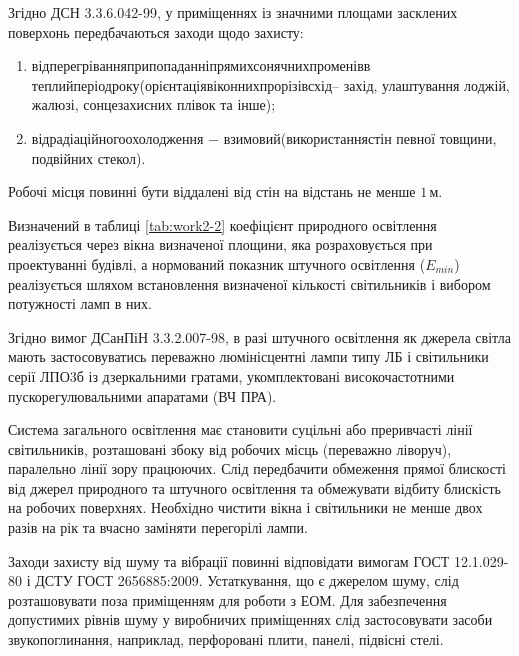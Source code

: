 Згідно ДСН 3.3.6.042-99, у приміщеннях із значними площами засклених поверхонь передбачаються заходи щодо захисту:

\begin{enumerate}
	\item від\hfill перегрівання\hfill при\hfill попаданні\hfill прямих\hfill сонячних\hfill променів\hfill в\newline \hspace*{-18mm} теплий\hfill період\hfill року\hfill (орієнтація\hfill віконних\hfill прорізів\hfill схід\hfill – захід,\newline \hspace*{-18mm} улаштування лоджій, жалюзі, сонцезахисних плівок та інше);
	\item від\hfill радіаційного\hfill охолодження $-$ в\hfill зимовий\hfill (використання\hfill стін\newline \hspace*{-18mm} певної товщини, подвійних стекол).
\end{enumerate}

Робочі місця повинні бути віддалені від стін на відстань не менше $1 \, \text{м}$. 

Визначений в таблиці \ref{tab:work2-2} коефіцієнт природного освітлення реалізується через вікна визначеної площини, яка розраховується при проектуванні будівлі, а нормований показник штучного освітлення ($E_{min}$) реалізується шляхом встановлення визначеної кількості світильників і вибором потужності ламп в них.

Згідно вимог ДСанПіН 3.3.2.007-98, в разі штучного освітлення як джерела світла мають застосовуватись переважно люмінісцентні лампи типу ЛБ і світильники серії ЛПО3б із дзеркальними гратами, укомплектовані високочастотними пускорегулювальними апаратами (ВЧ ПРА).

Система загального освітлення має становити суцільні або преривчасті лінії світильників, розташовані збоку від робочих місць (переважно ліворуч), паралельно лінії зору працюючих. Слід передбачити обмеження прямої блискості від джерел природного та штучного освітлення та обмежувати відбиту блискість на робочих поверхнях. Необхідно чистити вікна і світильники не менше двох разів на рік та вчасно заміняти перегорілі лампи.

Заходи захисту від шуму та вібрації повинні відповідати вимогам ГОСТ 12.1.029-80 і ДСТУ ГОСТ 2656885:2009. Устаткування, що є джерелом шуму, слід розташовувати поза приміщенням для роботи з ЕОМ. Для забезпечення допустимих рівнів шуму у виробничих приміщеннях слід застосовувати засоби звукопоглинання, наприклад, перфоровані плити, панелі, підвісні стелі.

